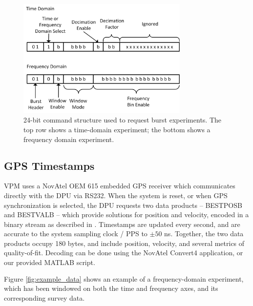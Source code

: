 \begin{figure}[t]
\begin{center}
\includegraphics[width=20pc]{figures/vpm_figures/burst_commands.png}

\caption[24-bit command structure for burst experiments]{24-bit command structure used to request burst experiments. The top row shows a time-domain experiment; the bottom shows a frequency domain experiment.}
\label{fig:burst_commands}
\end{center}
\end{figure}


\subsection{GPS Timestamps}
VPM uses a NovAtel OEM 615 embedded GPS receiver which communicates directly with the DPU via RS232. When the system is reset, or when GPS synchronization is selected, the DPU requests two data products -- BESTPOSB and BESTVALB -- which provide solutions for position and velocity, encoded in a binary stream as described in \citep{novatel}. Timestamps are updated every second, and are accurate to the system sampling clock / PPS to $\pm 50$ ns. Together, the two data products occupy 180 bytes, and include position, velocity, and several metrics of quality-of-fit. Decoding can be done using the NovAtel Convert4 application, or our provided MATLAB script.

Figure \ref{fig:example_data} shows an example of a frequency-domain experiment, which has been windowed on both the time and frequency axes, and its corresponding survey data.

